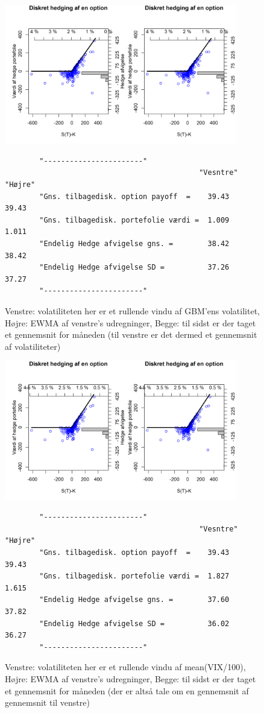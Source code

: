 \documentclass{article}
\theoremstyle{definition}
\theoremstyle{remark}
\begin{document}
\begin{figure}
    \centering
    \includegraphics[width=4in]{1 product_call_meanrolling_meanEMVA}
    \caption{Venstre: volatiliteten her er et rullende vindu af GBM'ens volatilitet, Højre: EWMA af venstre's udregninger, Begge: til sidst er der taget et gennemsnit for måneden (til venstre er det dermed et gennemsnit af volatiliteter)}
    \begin{verbatim}
        "-----------------------"                         
                                             "Vesntre"       "Højre"
        "Gns. tilbagedisk. option payoff  =    39.43          39.43
        "Gns. tilbagedisk. portefolie værdi =  1.009          1.011
        "Endelig Hedge afvigelse gns. =        38.42          38.42
        "Endelig Hedge afvigelse SD =          37.26          37.27
        "-----------------------"
    \end{verbatim}
    \label{fig:rullende}
\end{figure}
\begin{figure}
    \centering
    \includegraphics[width=4in]{2 product_call_meanrolling_meanEMVA}
    \caption{Venstre: volatiliteten her er et rullende vindu af mean(VIX/100), Højre: EWMA af venstre's udregninger, Begge: til sidst er der taget et gennemsnit for måneden (der er altså tale om en gennemsnit af gennemsnit til venstre)}
    \begin{verbatim}
        "-----------------------"                         
                                             "Vesntre"       "Højre"
        "Gns. tilbagedisk. option payoff  =    39.43          39.43
        "Gns. tilbagedisk. portefolie værdi =  1.827          1.615
        "Endelig Hedge afvigelse gns. =        37.60          37.82
        "Endelig Hedge afvigelse SD =          36.02          36.27
        "-----------------------"
    \end{verbatim}
    \label{fig:rullendeVIX}
\end{figure}
\end{document}
